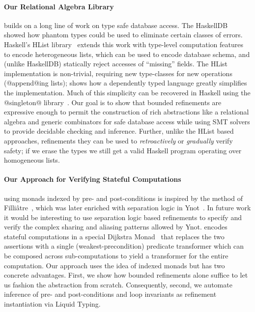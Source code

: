 \paragraph{Our Relational Algebra Library} builds on a long
line of work on type safe database access.
%
The HaskellDB~\citep{haskellDB}
showed how phantom types could be used to eliminate
certain classes of errors.
%
Haskell's HList library~\citep{heterogeneous}
extends this work with type-level computation
features to encode heterogeneous lists, which
can be used to encode database schema, and
(unlike HaskellDB) statically reject accesses
of ``missing'' fields.
%
The HList implementation is non-trivial,
requiring new type-classes for new operations
(\eg @append@ing lists); \citep{thepipower}
shows how a dependently typed language greatly
simplifies the implementation.
%
Much of this simplicity can be recovered in
Haskell using the @singleton@ library~\citep{Weirich12}.
%
Our goal is to show that bounded refinements
are expressive enough to permit the construction
of rich abstractions like a relational algebra
and generic combinators for safe database access
while using SMT solvers to provide decidable
checking and inference. Further, unlike the
HList based approaches, refinements they can
be used to \emph{retroactively} or \emph{gradually}
verify safety; if we erase the types we still
get a valid Haskell program operating over
homogeneous lists.





\paragraph{Our Approach for Verifying Stateful Computations} using monads
indexed by pre- and post-conditions is inspired by the method of
Filli\^atre~\citep{Filliatre98}, which was later enriched with
separation logic in Ynot~\citep{ynot}. In future work it would
be interesting to use separation logic based refinements to specify
and verify the complex sharing and aliasing patterns allowed by Ynot.
%
\fstar encodes stateful computations in a special Dijkstra
Monad~\citep{dijkstramonad} that replaces the two assertions with
a single (weakest-precondition) predicate transformer which
can be composed across sub-computations to yield a transformer
for the entire computation.
%
Our \RIO approach uses the idea of indexed monads but
has two concrete advantages.
%
First, we show how bounded refinements alone suffice to
let us fashion the \RIO abstraction from scratch.
%
Consequently, second, we automate inference of pre- and
post-conditions and loop invariants as refinement instantiation
via Liquid Typing.


